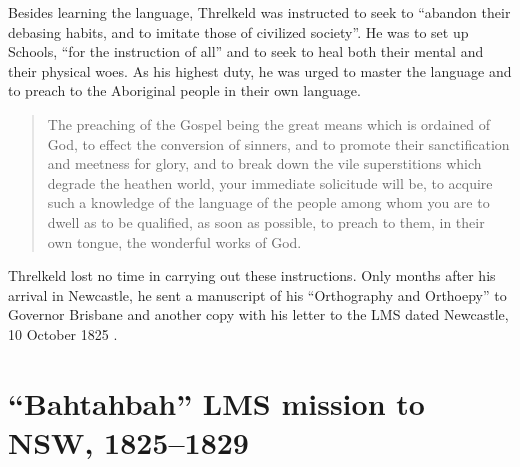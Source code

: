 Besides learning the language, Threlkeld was instructed to seek to “abandon their debasing habits, and to imitate those of civilized society”. He was to set up Schools, “for the instruction of all” and to seek to heal both their mental and their physical woes. As his highest duty, he was urged to master the language and to preach to the Aboriginal people in their own language.

\begin{quote}
     The preaching of the Gospel being the great means which is ordained of God, to effect the conversion of sinners, and to promote their sanctification and meetness for glory, and to break down the vile superstitions which degrade the heathen world, your immediate solicitude will be, to acquire such a knowledge of the language of the people among whom you are to dwell as to be qualified, as soon as possible, to preach to them, in their own tongue, the wonderful works of God. \citep[19]{threlkeld_threlkeld_1822-1862}
\end{quote}

Threlkeld lost no time in carrying out these instructions. Only months after his arrival in Newcastle, he sent a manuscript of his “Orthography and Orthoepy” to Governor Brisbane \citep{threlkeld_orthography_1825} and another copy with his letter to the LMS dated Newcastle, 10 October 1825 \citep[box 2/ folder 3]{threlkeld_orthography_1825}.

\section{“Bahtahbah” LMS mission to NSW, 1825--1829}

